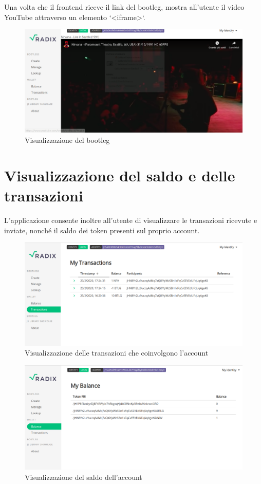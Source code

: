 Una volta che il frontend riceve il link del bootleg, mostra all'utente il video YouTube attraverso un elemento `<iframe>`.
\begin{figure}[H]
    \includegraphics[width=\linewidth]{images/application/watch.png}
    \caption{Visualizzazione del bootleg}
    \label{fig:watch}
\end{figure}

\section{Visualizzazione del saldo e delle transazioni}

L'applicazione consente inoltre all'utente di visualizzare le transazioni ricevute e inviate, nonché il saldo dei token presenti sul proprio account.

\begin{figure}[H]
    \includegraphics[width=\linewidth]{images/application/transactions.png}
    \caption{Visualizzazione delle transazioni che coinvolgono l'account}
    \label{fig:transactions}
\end{figure}

\begin{figure}[H]
    \includegraphics[width=\linewidth]{images/application/balance.png}
    \caption{Visualizzazione del saldo dell'account}
    \label{fig:balance}
\end{figure}